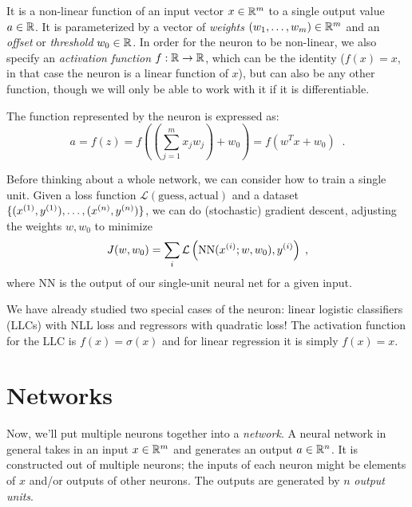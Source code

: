 It is a non-linear function of an input vector  $x \in \mathbb{R}^m$  to a single output value $a \in \mathbb{R}$.  It is
parameterized by a vector of {\em weights} $(w_1, \ldots, w_m) \in
  \mathbb{R}^m$ and an {\em offset}  or {\em threshold} $w_0 \in \mathbb{R}$. In order for the neuron to be non-linear, we also specify an {\em
    activation function} $f : \mathbb{R} \rightarrow \mathbb{R}$, which can be the
identity ($f(x) = x$, in that case the neuron is a linear function of $x$), but can also be any other function, though we
will only be able to work with it if it is differentiable.

The function represented by the neuron is expressed as:
\[a = f(z) = f\left(\left(\sum_{j=1}^m x_jw_j\right) + w_0\right) = f(w^Tx + w_0)\;\;.\]

Before thinking about a whole network, we can consider how to train a
single unit. Given a loss function $\mathcal{L}(\text{guess}, \text{actual})$
and a dataset $\{(x^{(1)}, y^{(1)}), \ldots,
  (x^{(n)},y^{(n)})\}$, we can
do (stochastic) gradient descent, adjusting the weights
$w, w_0$ to minimize
\[J(w, w_0) = \sum_{i} \mathcal{L}\left(\text{NN}(x^{(i)}; w, w_0), y^{(i)}\right)\;,\]
where $\text{NN}$ is the output of our single-unit neural net for a given input.

We have already studied two special cases of the neuron:
linear logistic classifiers (LLCs) with NLL loss and regressors with
quadratic loss! The activation function for the LLC is $f(x) =
  \sigma(x)$ and for linear regression it is simply $f(x) = x$.
\section{Networks}
Now, we'll put multiple neurons together into a {\em network}.  A
neural network in general takes in an input $x \in \mathbb{R}^m$ and generates
an output $a \in \mathbb{R}^n$.  It is constructed out of multiple neurons;
the inputs of each neuron might be elements of $x$ and/or outputs of
other neurons.   The outputs are generated by $n$ {\em output units}.  

